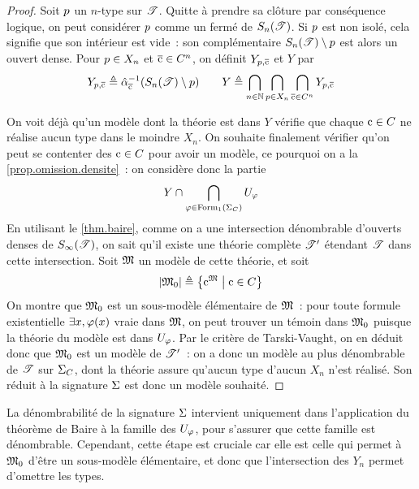 \begin{proof}
  Soit $p$ un $n$-type sur $\mathscr T$. Quitte à prendre sa clôture par
  conséquence logique, on peut considérer $p$ comme un fermé de
  $S_{n}(\mathscr T)$. Si $p$ est non isolé, cela signifie que son
  intérieur est vide~: son complémentaire $S_{n}(\mathscr T)\setminus p$
  est alors un ouvert dense. Pour $p\in X_n$ et $\overline{\mathrm{c}}\in C^n$, on
  définit $Y_{p,\overline{\mathrm{c}}}$ et $Y$ par
  \[Y_{p,\overline{\mathrm{c}}} \triangleq
  \hat{\alpha}^{-1}_{\overline{\mathrm{c}}}(S_{n}(\mathscr T)\setminus p)\qquad
  Y \triangleq \bigcap_{n \in \mathbb N}\bigcap_{p\in X_n}\bigcap_{\overline{\mathrm{c}}\in C^n}
  Y_{p,\overline{\mathrm{c}}}\]

  On voit déjà qu'un modèle dont la théorie est dans $Y$ vérifie que chaque
  $\mathrm{c}\in C$ ne réalise aucun type dans le moindre $X_n$. On souhaite
  finalement vérifier qu'on peut se contenter des $\mathrm{c}\in C$ pour avoir un
  modèle, ce pourquoi on a la \cref{prop.omission.densite}~: on considère donc
  la partie
  \[Y \cap \bigcap_{\varphi\in\operatorname{Form}_1(\Sigma_{C})} U_{\varphi}\]
  En utilisant le \cref{thm.baire}, comme on a une intersection dénombrable
  d'ouverts denses de $S_{\infty}(\mathscr T)$, on sait qu'il existe une théorie
  complète $\mathscr T'$ étendant $\mathscr T$ dans cette intersection. Soit $\mathfrak{M}$ un
  modèle de cette théorie, et soit
  \[\left\vert \mathfrak{M}_0\right\vert\triangleq \left\{ \mathrm{c}^{\mathfrak{M}} \;\middle\vert\; \mathrm{c} \in C \right\}\]
  On montre que $\mathfrak{M}_0$ est un sous-modèle élémentaire de $\mathfrak{M}$~: pour
  toute formule existentielle $\exists x, \varphi(x)$ vraie dans $\mathfrak{M}$, on
  peut trouver un témoin dans $\mathfrak{M}_0$ puisque la théorie du modèle est
  dans $U_{\varphi}$. Par le critère de Tarski-Vaught, on en déduit donc que
  $\mathfrak{M}_0$ est un modèle de $\mathscr T'$~: on a donc un modèle au plus
  dénombrable de $\mathscr T$ sur $\Sigma_{C}$, dont la théorie assure qu'aucun type
  d'aucun $X_n$ n'est réalisé. Son réduit à la signature $\Sigma$ est donc un
  modèle souhaité.
\end{proof}

\begin{remark}
  La dénombrabilité de la signature $\Sigma$ intervient uniquement dans
  l'application du théorème de Baire à la famille des $U_{\varphi}$, pour
  s'assurer que cette famille est dénombrable. Cependant, cette étape est
  cruciale car elle est celle qui permet à $\mathfrak{M}_0$ d'être un sous-modèle
  élémentaire, et donc que l'intersection des $Y_n$ permet d'omettre les types.
\end{remark}

